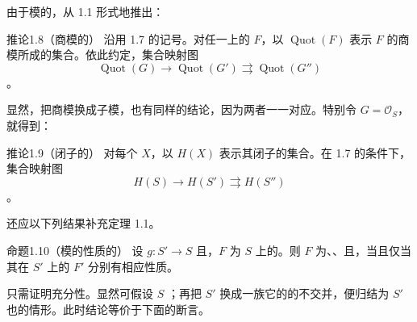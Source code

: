 由于模的，从 1.1 形式地推出：
\begin{SGAresult}{推论}{1.8（商模的）}
沿用 1.7 的记号。对任一上的 $F$，以 $\operatorname{Quot}(F)$ 表示 $F$ 的商模所成的集合。依此约定，集合映射图
\[
\operatorname{Quot}(G)\longrightarrow
\operatorname{Quot}(G')\rightrightarrows
\operatorname{Quot}(G'')
\]
。
\end{SGAresult}
显然，把商模换成子模，也有同样的结论，因为两者一一对应。特别令 $G=\mathcal O_S$，就得到：

\begin{SGAresult}{推论}{1.9（闭子的）}
对每个 $X$，以 $H(X)$ 表示其闭子的集合。在 1.7 的条件下，集合映射图
\[
H(S)\longrightarrow H(S')\rightrightarrows H(S'')
\]
。
\end{SGAresult}
还应以下列结果补充定理 1.1。

\begin{SGAresult}{命题}{1.10（模的性质的）}
设 $g:S'\to S$ 且，$F$ 为 $S$ 上的。则 $F$ 为、、且，当且仅当其在 $S'$ 上的 $F'$ 分别有相应性质。
\end{SGAresult}
只需证明充分性。显然可假设 $S$ ；再把 $S'$ 换成一族它的的不交并，便归结为 $S'$ 也的情形。此时结论等价于下面的断言。

